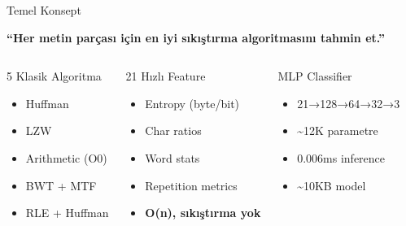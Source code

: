 \documentclass[10pt,aspectratio=43]{beamer}
\begin{document}
\begin{frame}{Temel Konsept}
  \begin{center}
    \textbf{``Her metin parçası için en iyi sıkıştırma algoritmasını tahmin et.''}
  \end{center}

  \vspace{0.5em}
  \begin{columns}[T]
    \begin{block}{5 Klasik Algoritma}
      \begin{itemize}
        \setlength{\itemsep}{0.3em}
        \item Huffman
        \item LZW
        \item Arithmetic (O0)
        \item BWT + MTF
        \item RLE + Huffman
      \end{itemize}
    \end{block}

    \begin{block}{21 Hızlı Feature}
      \begin{itemize}
        \setlength{\itemsep}{0.2em}
        \item Entropy (byte/bit)
        \item Char ratios
        \item Word stats
        \item Repetition metrics
        \item \textbf{O(n), sıkıştırma yok}
      \end{itemize}
    \end{block}

    \begin{block}{MLP Classifier}
      \begin{itemize}
        \setlength{\itemsep}{0.3em}
        \item 21→128→64→32→3
        \item \textasciitilde12K parametre
        \item 0.006ms inference
        \item \textasciitilde10KB model
      \end{itemize}
    \end{block}
  \end{columns}
\end{frame}
\end{document}

